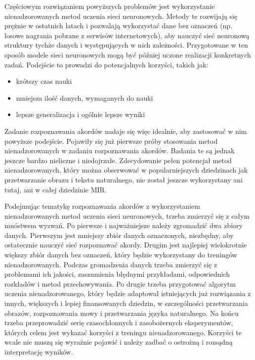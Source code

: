 Częściowym rozwiązaniem powyższych problemów jest wykorzystanie nienadzorowanych metod uczenia sieci neuronowych. Metody te rozwijają się prężnie w ostatnich latach i pozwalają wykorzystać dane bez oznaczeń (np. losowe nagrania pobrane z serwisów internetowych), aby nauczyć sieć neuronową struktury tychże danych i występujących w nich zależności. Przygotowane w ten sposób modele sieci neuronowych mogą być później uczone realizacji konkretnych zadań. Podejście to prowadzi do potencjalnych korzyści, takich jak:
\begin{itemize}
    \item krótszy czas nauki
    \item mniejsza ilość danych, wymaganych do nauki
    \item lepsze generalizacja i ogólnie lepsze wyniki
\end{itemize}
Zadanie rozpoznawania akordów nadaje się więc idealnie, aby zastosować w nim powyższe podejście. Pojawiły się już pierwsze próby stosowania metod nienadzorowanych w zadaniu rozpoznawania akordów. Badania te są jednak jeszcze bardzo nieliczne i niedojrzałe. Zdecydowanie pełen potencjał metod nienadzorowanych, który można obserwować w popularniejszych dziedzinach jak przetwarzanie obrazu i tekstu naturalnego, nie został jeszcze wykorzystany ani tutaj, ani w całej dziedzinie MIR.

Podejmując tematykę rozpoznawania akordów z wykorzystaniem nienadzorowanych metod uczenia sieci neuronowych, trzeba zmierzyć się z całym mnóstwem wyzwań. Po pierwsze i najważniejsze należy zgromadzić dwa zbiory danych. Pierwszym jest mniejszy zbiór danych oznaczonych, niezbędny, aby ostatecznie nauczyć sieć rozpoznawać akordy. Drugim jest najlepiej wielokrotnie większy zbiór danych bez oznaczeń, który będzie wykorzystany do treningów nienadzorowanych. Podczas gromadzenia danych trzeba zmierzyć się z problemami ich jakości, zaszumienia błędnymi przykładami, odpowiednich rozkładów i metod przechowywania. Po drugie trzeba przygotować algorytm uczenia nienadzorowanego, który będzie adaptował istniejących już rozwiązania z innych, większych i lepiej finansowanych dziedzin, w szczególności przetwarzania obrazów, rozpoznawania mowy i przetwarzania języka naturalnego. Na końcu trzeba przeprowadzić serię czasochłonnych i zasobożernych eksperymentów, których celem jest wykazać korzyści z treningu nienadzorowanego. Korzyści te wcale nie muszą się wyraźnie pojawić i należy zadbać o ostrożną i rozsądną interpretację wyników.

